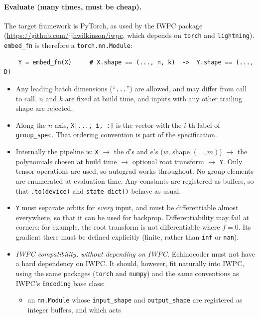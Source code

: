 \documentclass[11pt]{article}
\theoremstyle{definition}
\theoremstyle{remark}
\begin{document}
\paragraph{Evaluate (many times, must be cheap).}
The target framework is PyTorch, as used by the IWPC package
(\url{https://github.com/jjhwilkinson/iwpc}, which depends on \texttt{torch}
and \texttt{lightning}). \texttt{embed\_fn} is therefore a
\texttt{torch.nn.Module}:
\begin{verbatim}
    Y = embed_fn(X)     # X.shape == (..., n, k)  ->  Y.shape == (..., D)
\end{verbatim}
\begin{itemize}
  \item Any leading batch dimensions (``\texttt{...}'') are allowed, and may
    differ from call to call. $n$ and $k$ are fixed at build time, and inputs
    with any other trailing shape are rejected.
  \item Along the $n$ axis, \texttt{X[..., i, :]} is the vector with the
    $i$-th label of \texttt{group\_spec}. That ordering convention is part of
    the specification.
  \item Internally the pipeline is: \texttt{X} $\to$ the $d$'s and $e$'s
    ($w$, shape $(\ldots, m)$) $\to$ the polynomials chosen at build time
    $\to$ optional root transform $\to$ \texttt{Y}. Only tensor operations are
    used, so autograd works throughout. No group elements are enumerated at
    evaluation time. Any constants are registered as buffers, so that
    \texttt{.to(device)} and \texttt{state\_dict()} behave as usual.
  \item \texttt{Y} must separate orbits for \emph{every} input, and must be
    differentiable almost everywhere, so that it can be used for backprop.
    Differentiability may fail at corners: for example, the root transform
    is not differentiable where $f = 0$. Its gradient there must be defined
    explicitly (finite, rather than \texttt{inf} or \texttt{nan}).
  \item \emph{IWPC compatibility, without depending on IWPC.} Echinocoder must
    not have a hard dependency on IWPC. It should, however, fit naturally into
    IWPC, using the same packages (\texttt{torch} and \texttt{numpy}) and the
    same conventions as IWPC's \texttt{Encoding} base class:
    \begin{itemize}
      \item an \texttt{nn.Module} whose \texttt{input\_shape} and
        \texttt{output\_shape} are registered as integer buffers, and which acts

\end{itemize}
\end{itemize}
\end{document}

